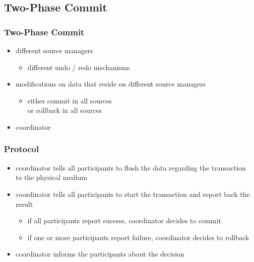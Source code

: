 \documentclass[dvipsnames]{beamer}
\theoremstyle{plain}
\begin{document}
\subsection{Two-Phase Commit}

\begin{frame}
  \frametitle{Two-Phase Commit}

  \begin{itemize}
    \item different source managers
    \begin{itemize}
      \item different undo / redo mechanisms
    \end{itemize}

    \pause
    \item modifications on data that reside on different source managers
    \begin{itemize}
      \item either commit in all sources\\
        or rollback in all sources
    \end{itemize}

    \pause
    \item \alert{coordinator}
  \end{itemize}
\end{frame}

\begin{frame}
  \frametitle{Protocol}

  \begin{itemize}
    \item coordinator tells all participants to flush the data regarding
      the transaction to the physical medium

    \pause
    \item coordinator tells all participants to start the transaction and
      report back the result
    \begin{itemize}
      \item if all participants report success, coordinator decides to
        commit
      \item if one or more participants report failure, coordinator decides
        to rollback
    \end{itemize}

    \pause
    \item coordinator informs the participants about the decision
  \end{itemize}
\end{frame}
\end{document}

